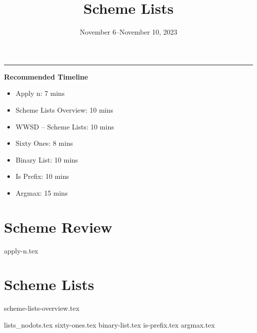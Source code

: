 \documentclass{exam}
\title{Scheme Lists}
\date{November 6--November 10, 2023}
\begin{document}
\maketitle\rule{\textwidth}{0.15em}

\begin{meta}
    \begin{blocksection}
        \textbf{Recommended Timeline}
        \begin{itemize}
            \item Apply n: 7 mins
            \item Scheme Lists Overview: 10 mins
            \item WWSD -- Scheme Lists: 10 mins
            \item Sixty Ones: 8 mins
            \item Binary List: 10 mins
            \item Is Prefix: 10 mins
            \item Argmax: 15 mins
        \end{itemize}
    \end{blocksection}
\end{meta}

\section{Scheme Review}
\begin{questions}
    {apply-n.tex}
\end{questions}

\section{Scheme Lists}
{scheme-lists-overview.tex}
\newpage
\begin{questions}
{lists_nodots.tex}
{sixty-ones.tex}
{binary-list.tex}
{is-prefix.tex}
{argmax.tex} 
\end{questions}
\end{document}
